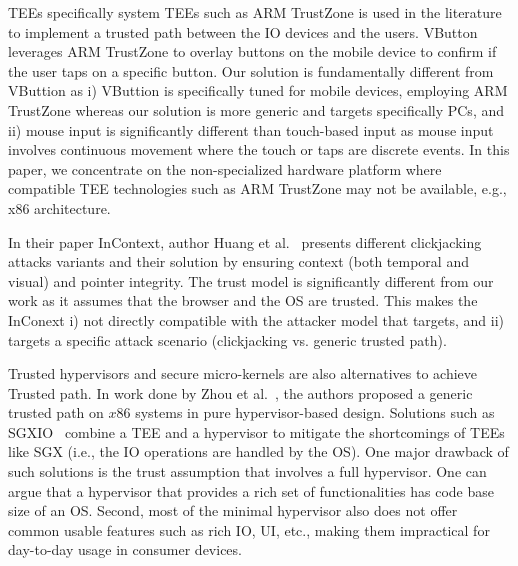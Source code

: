  TEEs specifically system TEEs such as ARM TrustZone is used in the literature to implement a trusted path between the IO devices and the users. %
VButton~\cite{li2018vbutton} leverages ARM TrustZone to overlay buttons on the mobile device to confirm if the user taps on a specific button. Our solution is fundamentally different from VButtion as i) VButtion is specifically tuned for mobile devices, employing ARM TrustZone whereas our solution is more generic and targets specifically PCs, and ii) mouse input is significantly different than touch-based input as mouse input involves continuous movement where the touch or taps are discrete events. In this paper, we concentrate on the non-specialized hardware platform where compatible TEE technologies such as ARM TrustZone may not be available, e.g., x86 architecture. 

 In their paper InContext, author Huang et al.~\cite{huang2012clickjacking} presents different clickjacking attacks variants and their solution by ensuring context (both temporal and visual) and pointer integrity. The trust model is significantly different from our work as it assumes that the browser and the OS are trusted. This makes the InConext i) not directly compatible with the attacker model that \name targets, and ii) targets a specific attack scenario (clickjacking vs. generic trusted path).


 Trusted hypervisors and secure micro-kernels are also alternatives to achieve Trusted path. In work done by Zhou et al.~\cite{zhou2012building}, the authors proposed a generic trusted path on $x86$ systems in pure hypervisor-based design. Solutions such as SGXIO~\cite{weiser2017sgxio}  combine a TEE and a hypervisor to mitigate the shortcomings of TEEs like SGX (i.e., the IO operations are handled by the OS). One major drawback of such solutions is the trust assumption that involves a full hypervisor. One can argue that a hypervisor that provides a rich set of functionalities has code base size of an OS. Second, most of the minimal hypervisor also does not offer common usable features such as rich IO, UI, etc., making them impractical for day-to-day usage in consumer devices. %

